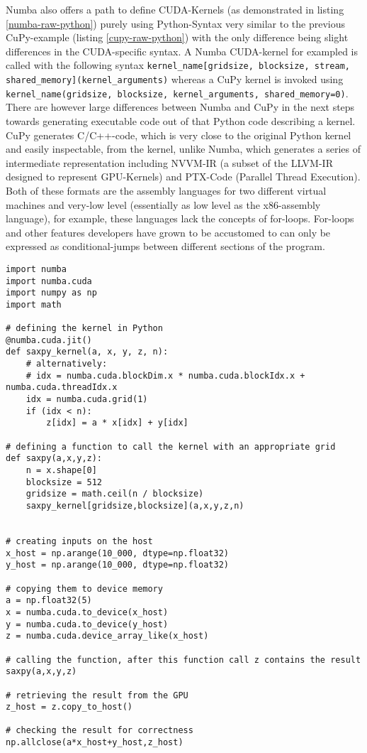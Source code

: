 \documentclass[english,11pt,a4paper,table]{article} %
\begin{document}
Numba also offers a path to define CUDA-Kernels (as demonstrated in listing \ref{numba-raw-python}) purely using Python-Syntax very similar to the previous CuPy-example (listing \ref{cupy-raw-python}) with the only difference being slight differences in the CUDA-specific syntax.
A Numba CUDA-kernel for exampled is called with the following syntax \texttt{kernel\_name[gridsize, blocksize, stream, shared\_memory](kernel\_arguments)} whereas a CuPy kernel is invoked using \texttt{kernel\_name(gridsize, blocksize, kernel\_arguments, shared\_memory=0)}.
There are however large differences between Numba and CuPy in the next steps towards generating executable code out of that Python code describing a kernel.
CuPy generates C/C++-code, which is very close to the original Python kernel and easily inspectable, from the kernel, unlike Numba, which generates a series of intermediate representation including NVVM-IR \cite{NVVMIRCU80:online} (a subset of the LLVM-IR designed to represent GPU-Kernels) and PTX-Code \cite{PTXISACU80:online} (Parallel Thread Execution).
Both of these formats are the assembly languages for two different virtual machines and very-low level (essentially as low level as the x86-assembly language), for example, these languages lack the concepts of for-loops.
For-loops and other features developers have grown to be accustomed to can only be expressed as conditional-jumps between different sections of the program.

\begin{verbatim}
import numba
import numba.cuda
import numpy as np
import math

# defining the kernel in Python
@numba.cuda.jit()
def saxpy_kernel(a, x, y, z, n):
	# alternatively:
	# idx = numba.cuda.blockDim.x * numba.cuda.blockIdx.x + numba.cuda.threadIdx.x
    idx = numba.cuda.grid(1)
    if (idx < n):
        z[idx] = a * x[idx] + y[idx]

# defining a function to call the kernel with an appropriate grid
def saxpy(a,x,y,z):
    n = x.shape[0]
    blocksize = 512
    gridsize = math.ceil(n / blocksize)
    saxpy_kernel[gridsize,blocksize](a,x,y,z,n)


# creating inputs on the host
x_host = np.arange(10_000, dtype=np.float32)
y_host = np.arange(10_000, dtype=np.float32)

# copying them to device memory
a = np.float32(5)
x = numba.cuda.to_device(x_host)
y = numba.cuda.to_device(y_host)
z = numba.cuda.device_array_like(x_host)

# calling the function, after this function call z contains the result
saxpy(a,x,y,z)

# retrieving the result from the GPU
z_host = z.copy_to_host()

# checking the result for correctness
np.allclose(a*x_host+y_host,z_host)
\end{verbatim}
\end{document}
